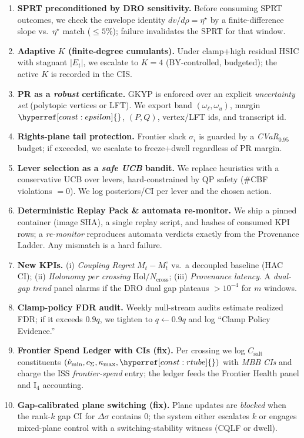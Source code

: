 \documentclass[10pt]{article}
\newcommand{\cutq}{q}
\newcommand{\constref}[1]{\hyperref[const:#1]{\ensuremath{\csname constsym#1\endcsname}}}
\begin{document}
\begin{enumerate}[leftmargin=*,itemsep=2pt]
\item \textbf{SPRT preconditioned by DRO sensitivity.} Before consuming SPRT outcomes, we check the envelope identity $dv/d\rho=\eta^\star$ by a finite-difference slope vs.\ $\eta^\star$ match ($\le5\%$); failure invalidates the SPRT for that window.
\item \textbf{Adaptive $K$ (finite-degree cumulants).} Under clamp+high residual HSIC with stagnant $|E_t|$, we escalate to $K{=}4$ (BY-controlled, budgeted); the active $K$ is recorded in the CIS.
\item \textbf{PR as a \emph{robust} certificate.} GKYP is enforced over an explicit \emph{uncertainty set} (polytopic vertices or LFT). We export band $(\omega_\ell,\omega_u)$, margin $\constref{epsilon}$, $(P,Q)$, vertex/LFT ids, and transcript id.
\item \textbf{Rights-plane tail protection.} Frontier slack $\sigma_i$ is guarded by a \emph{CVaR}$_{0.95}$ budget; if exceeded, we escalate to freeze+dwell regardless of PR margin.
\item \textbf{Lever selection as a \emph{safe UCB} bandit.} We replace heuristics with a conservative UCB over levers, hard-constrained by QP safety (\#CBF violations $=0$). We log posteriors/CI per lever and the chosen action.
\item \textbf{Deterministic Replay Pack \& automata re-monitor.} We ship a pinned container (image SHA), a single replay script, and hashes of consumed KPI rows; a \emph{re-monitor} reproduces automata verdicts exactly from the Provenance Ladder. Any mismatch is a hard failure.
\item \textbf{New KPIs.} (i) \emph{Coupling Regret} $M_t-M_t^\circ$ vs.\ a decoupled baseline (HAC CI); (ii) \emph{Holonomy per crossing} $\mathrm{Hol}/N_{\mathrm{cross}}$; (iii) \emph{Provenance latency}. A \emph{dual-gap trend} panel alarms if the DRO dual gap plateaus $>10^{-4}$ for $m$ windows.
\item \textbf{Clamp-policy FDR audit.} Weekly null-stream audits estimate realized FDR; if it exceeds $0.9\cutq$, we tighten to $\cutq\leftarrow 0.9\cutq$ and log “Clamp Policy Evidence.”
\item \textbf{Frontier Spend Ledger with CIs (fix).} Per crossing we log $C_{\mathrm{salt}}$ constituents $(\hat\nu_{\min},c_\Sigma,\kappa_{\max},\constref{rtube})$ with \emph{MBB CIs} and charge the ISS \emph{frontier-spend} entry; the ledger feeds the Frontier Health panel and I$_4$ accounting.
\item \textbf{Gap-calibrated plane switching (fix).} Plane updates are \emph{blocked} when the rank-$k$ gap CI for $\Delta\sigma$ contains $0$; the system either escalates $k$ or engages mixed-plane control with a switching-stability witness (CQLF or dwell).

\end{enumerate}
\end{document}
